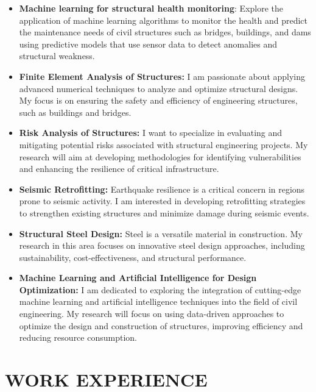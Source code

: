 \documentclass[letterpaper, 12pt]{article}
\newcommand{\cvsection}[1]{
	
	\section*{#1}
}
\begin{document}
	\begin{itemize}[leftmargin=*]
		
		\item \textbf{Machine learning for structural health monitoring}: Explore the application of machine learning algorithms to monitor the health and predict the maintenance needs of civil structures such as bridges, buildings, and dams using predictive models that use sensor data to detect anomalies and structural weakness.
		
		\item \textbf{Finite Element Analysis of Structures:} I am passionate about applying advanced numerical techniques to analyze and optimize structural designs. My focus is on ensuring the safety and efficiency of engineering structures, such as buildings and bridges.
		
		\item \textbf{Risk Analysis of Structures:} I want to specialize in evaluating and mitigating potential risks associated with structural engineering projects. My research will aim at developing methodologies for identifying vulnerabilities and enhancing the resilience of critical infrastructure.
		
		\item \textbf{Seismic Retrofitting:} Earthquake resilience is a critical concern in regions prone to seismic activity. I am interested in developing retrofitting strategies to strengthen existing structures and minimize damage during seismic events.
		
		\item \textbf{Structural Steel Design:} Steel is a versatile material in construction. My research in this area focuses on innovative steel design approaches, including sustainability, cost-effectiveness, and structural performance.
		
		\item \textbf{Machine Learning and Artificial Intelligence for Design Optimization:} I am dedicated to exploring the integration of cutting-edge machine learning and artificial intelligence techniques into the field of civil engineering. My research will focus on using data-driven approaches to optimize the design and construction of structures, improving efficiency and reducing resource consumption.
		
	\end{itemize}
	
	
	\cvsection{WORK EXPERIENCE}
	
\end{document}
